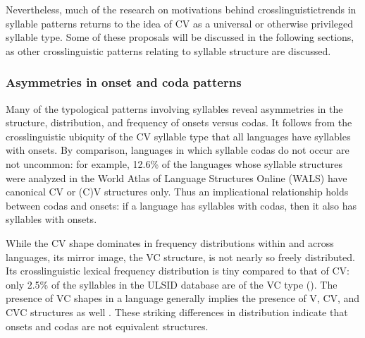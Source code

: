   Nevertheless, much of the research on motivations behind crosslinguistic\linebreak trends in syllable patterns returns to the idea of CV as a universal or otherwise privileged syllable type. Some of these proposals will be discussed in the following sections, as other crosslinguistic patterns relating to syllable structure are discussed.

\subsubsection{{Asymmetries} {in} {onset} {and} {coda} {patterns}}\label{sec:1.1.2.2}

  Many of the typological patterns involving syllables reveal asymmetries in the structure, distribution, and frequency of onsets versus codas. It follows from the crosslinguistic ubiquity of the CV syllable type that all languages have syllables with onsets. By comparison, languages in which syllable codas do not occur are not uncommon: for example, 12.6\% of the languages whose syllable structures were analyzed in the World Atlas of Language Structures Online (WALS) have canonical CV or (C)V structures only. Thus an implicational relationship holds between codas and onsets: if a language has syllables with codas, then it also has syllables with onsets.

  While the CV shape dominates in frequency distributions within and across languages, its mirror image, the VC structure, is not nearly so freely distributed. Its crosslinguistic lexical frequency distribution is tiny compared to that of CV: only 2.5\% of the syllables in the ULSID database are of the VC type (\citealt{ValléeEtAl2009}). The presence of VC shapes in a language generally implies the presence of V, CV, and CVC structures as well \citep{Blevins1995}. These striking differences in distribution indicate that onsets and codas are not equivalent structures.

